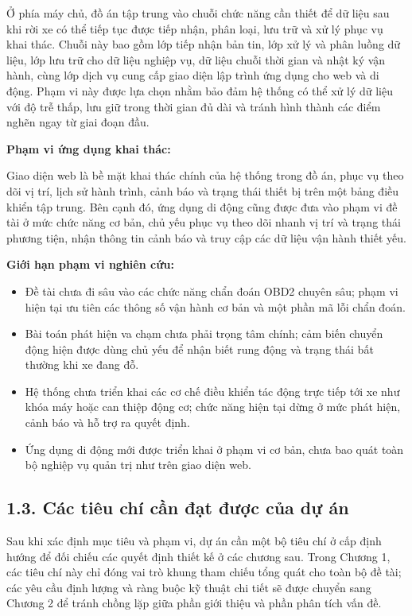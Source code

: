 \documentclass[a4paper]{extarticle}
\providecommand{\tightlist}{%
  \setlength{\itemsep}{0pt}\setlength{\parskip}{0pt}}
\begin{document}
Ở phía máy chủ, đồ án tập trung vào chuỗi chức năng cần thiết để dữ liệu
sau khi rời xe có thể tiếp tục được tiếp nhận, phân loại, lưu trữ và xử
lý phục vụ khai thác. Chuỗi này bao gồm lớp tiếp nhận bản tin, lớp xử lý
và phân luồng dữ liệu, lớp lưu trữ cho dữ liệu nghiệp vụ, dữ liệu chuỗi
thời gian và nhật ký vận hành, cùng lớp dịch vụ cung cấp giao diện lập
trình ứng dụng cho web và di động. Phạm vi này được lựa chọn nhằm bảo
đảm hệ thống có thể xử lý dữ liệu với độ trễ thấp, lưu giữ trong thời
gian đủ dài và tránh hình thành các điểm nghẽn ngay từ giai đoạn đầu.

\textbf{Phạm vi ứng dụng khai thác:}

Giao diện web là bề mặt khai thác chính của hệ thống trong đồ án, phục vụ
theo dõi vị trí, lịch sử hành trình, cảnh báo và trạng thái thiết bị trên
một bảng điều khiển tập trung. Bên cạnh đó, ứng dụng di động cũng được
đưa vào phạm vi đề tài ở mức chức năng cơ bản, chủ yếu phục vụ theo dõi
nhanh vị trí và trạng thái phương tiện, nhận thông tin cảnh báo và truy
cập các dữ liệu vận hành thiết yếu.

\textbf{Giới hạn phạm vi nghiên cứu:}

\begin{itemize}
\tightlist
\item
  Đề tài chưa đi sâu vào các chức năng chẩn đoán OBD2 chuyên sâu; phạm
  vi hiện tại ưu tiên các thông số vận hành cơ bản và một phần mã lỗi
  chẩn đoán.
\item
  Bài toán phát hiện va chạm chưa phải trọng tâm chính; cảm biến chuyển
  động hiện được dùng chủ yếu để nhận biết rung động và trạng thái bất
  thường khi xe đang đỗ.
\item
  Hệ thống chưa triển khai các cơ chế điều khiển tác động trực tiếp tới
  xe như khóa máy hoặc can thiệp động cơ; chức năng hiện tại dừng ở mức
  phát hiện, cảnh báo và hỗ trợ ra quyết định.
\item
  Ứng dụng di động mới được triển khai ở phạm vi cơ bản, chưa bao quát
  toàn bộ nghiệp vụ quản trị như trên giao diện web.
\end{itemize}

\subsection{1.3. Các tiêu chí cần đạt được của dự án}\label{cuxe1c-tiuxeau-chuxed-cux1ea7n-ux111ux1ea1t-ux111ux1b0ux1ee3c-cux1ee7a-dux1ef1-uxe1n}

Sau khi xác định mục tiêu và phạm vi, dự án cần một bộ tiêu chí ở cấp
định hướng để đối chiếu các quyết định thiết kế ở các chương sau. Trong
Chương 1, các tiêu chí này chỉ đóng vai trò khung tham chiếu tổng quát
cho toàn bộ đề tài; các yêu cầu định lượng và ràng buộc kỹ thuật chi tiết
sẽ được chuyển sang Chương 2 để tránh chồng lặp giữa phần giới thiệu và
phần phân tích vấn đề.
\end{document}
